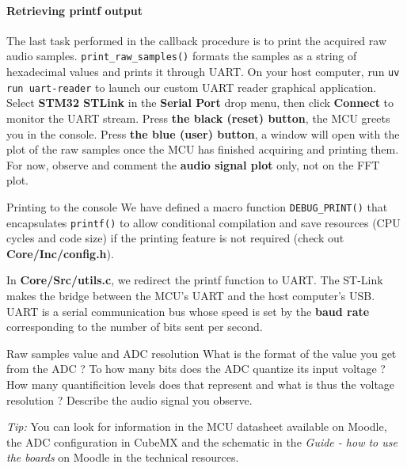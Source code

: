 \paragraph{Retrieving printf output}

The last task performed in the callback procedure is to print the acquired raw audio samples. \texttt{print\_raw\_samples()} formats the samples as a string of hexadecimal values and prints it through UART. On your host computer, run \texttt{uv run uart-reader} to launch our custom UART reader graphical application. Select \textbf{STM32 STLink} in the \textbf{Serial Port} drop menu, then click \textbf{Connect} to monitor the UART stream. Press \textbf{the black (reset) button}, the MCU greets you in the console. Press \textbf{the blue (user) button}, a window will open with the plot of the raw samples once the MCU has finished acquiring and printing them. For now, observe and comment the \textbf{audio signal plot} only, not on the FFT plot.

\begin{bclogo}[couleur = gray!20, arrondi = 0.2, logo=\bcinfo]{Printing to the console}
We have defined a macro function \texttt{DEBUG\_PRINT()} that encapsulates \texttt{printf()} to allow conditional compilation and save resources (CPU cycles and code size) if the printing feature is not required (check out \textbf{Core/Inc/config.h}).

In \textbf{Core/Src/utils.c}, we redirect the printf function to UART. The ST-Link makes the bridge between the MCU's UART and the host computer's USB. UART is a serial communication bus whose speed is set by the \textbf{baud rate} corresponding to the number of bits sent per second.
\end{bclogo}

\begin{bclogo}[couleur = gray!20, arrondi = 0.2, logo=\bcquestion]{Raw samples value and ADC resolution}
What is the format of the value you get from the ADC ? To how many bits does the ADC quantize its input voltage ? How many quantificition levels does that represent and what is thus the voltage resolution ? Describe the audio signal you observe.

\textit{Tip:} You can look for information in the MCU datasheet available on Moodle, the ADC configuration in CubeMX and the schematic in the \textit{Guide - how to use the boards} on Moodle in the technical resources.
\end{bclogo}

